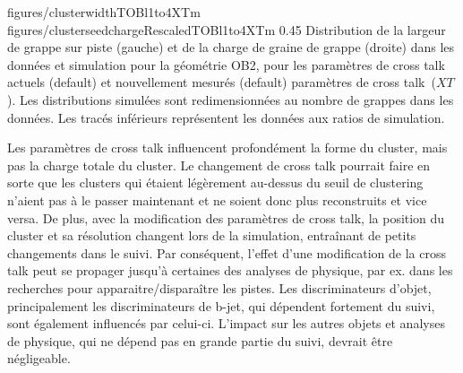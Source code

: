                  {figures/clusterwidthTOBl1to4XTm}
                 {figures/clusterseedchargeRescaledTOBl1to4XTm} %
                 {0.45}       %
                 {Distribution de la largeur de grappe sur piste (gauche) et de la charge  de graine de  grappe (droite) dans les données et simulation pour la géométrie OB2, pour les paramètres de cross talk actuels (default) et nouvellement mesurés (default) paramètres de cross talk~($XT$). Les distributions simulées sont redimensionnées au nombre de grappes dans les données. Les tracés inférieurs représentent les données aux ratios de simulation. }



Les paramètres de cross talk influencent profondément la forme du cluster, mais pas la charge totale du cluster. Le changement de cross talk pourrait faire en sorte que les clusters qui étaient légèrement au-dessus du seuil de clustering n’aient pas à le passer maintenant et ne soient donc plus reconstruits et vice versa. De plus, avec la modification des paramètres de cross talk, la position du cluster et sa résolution changent lors de la simulation, entraînant de petits changements dans le suivi. Par conséquent, l'effet d'une modification de la cross talk peut se propager jusqu'à certaines des analyses de physique, par ex. dans les recherches pour apparaitre/disparaître les pistes. Les discriminateurs d'objet, principalement les discriminateurs de b-jet, qui dépendent fortement du suivi, sont également influencés par celui-ci. L'impact sur les autres objets et analyses de physique, qui ne dépend pas en grande partie du suivi, devrait être négligeable.

